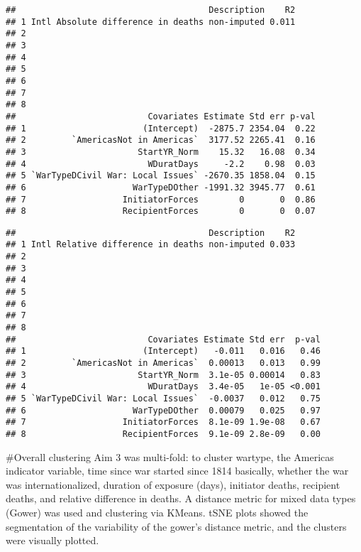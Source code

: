 \documentclass[
]{article}
\begin{document}
\begin{verbatim}
##                                      Description    R2
## 1 Intl Absolute difference in deaths non-imputed 0.011
## 2                                                     
## 3                                                     
## 4                                                     
## 5                                                     
## 6                                                     
## 7                                                     
## 8                                                     
##                          Covariates Estimate Std err p-val
## 1                       (Intercept)  -2875.7 2354.04  0.22
## 2         `AmericasNot in Americas`  3177.52 2265.41  0.16
## 3                      StartYR_Norm    15.32   16.08  0.34
## 4                        WDuratDays     -2.2    0.98  0.03
## 5 `WarTypeDCivil War: Local Issues` -2670.35 1858.04  0.15
## 6                     WarTypeDOther -1991.32 3945.77  0.61
## 7                   InitiatorForces        0       0  0.86
## 8                   RecipientForces        0       0  0.07
\end{verbatim}

\begin{verbatim}
##                                      Description    R2
## 1 Intl Relative difference in deaths non-imputed 0.033
## 2                                                     
## 3                                                     
## 4                                                     
## 5                                                     
## 6                                                     
## 7                                                     
## 8                                                     
##                          Covariates Estimate Std err  p-val
## 1                       (Intercept)   -0.011   0.016   0.46
## 2         `AmericasNot in Americas`  0.00013   0.013   0.99
## 3                      StartYR_Norm  3.1e-05 0.00014   0.83
## 4                        WDuratDays  3.4e-05   1e-05 <0.001
## 5 `WarTypeDCivil War: Local Issues`  -0.0037   0.012   0.75
## 6                     WarTypeDOther  0.00079   0.025   0.97
## 7                   InitiatorForces  8.1e-09 1.9e-08   0.67
## 8                   RecipientForces  9.1e-09 2.8e-09   0.00
\end{verbatim}

\#Overall clustering Aim 3 was multi-fold: to cluster wartype, the
Americas indicator variable, time since war started since 1814
basically, whether the war was internationalized, duration of exposure
(days), initiator deaths, recipient deaths, and relative difference in
deaths. A distance metric for mixed data types (Gower) was used and
clustering via KMeans. tSNE plots showed the segmentation of the
variability of the gower's distance metric, and the clusters were
visually plotted.
\end{document}
